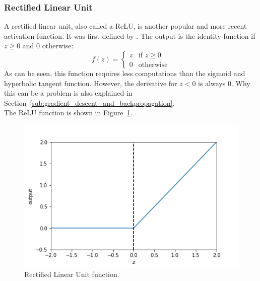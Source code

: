 \subsubsection{Rectified Linear Unit} %
\label{ssub:rectified_linear_unit}
A rectified linear unit, also called a ReLU, is another popular and more recent activation function. It was first defined by \cite{conf/icml/NairH10}. The output is the identity function if $z \ge 0$ and $0$ otherwise:
\begin{equation}
    f(z) = \begin{cases}
        z & \text{if $z \ge 0$}\\
        0 & \text{otherwise}
        \end{cases}
\end{equation}
As can be seen, this function requires less computations than the sigmoid and hyperbolic tangent function. However, the derivative for $z<0$ is always $0$. Why this can be a problem is also explained in Section~\ref{sub:gradient_descent_and_backpropagation}.\\
The ReLU function is shown in Figure~\ref{fig:relu}.
\begin{figure}[htb]
    \centering
    \includegraphics[width=.8\linewidth]{images/activation_functions/relu.png}
    \caption[Rectified Linear Unit function]{Rectified Linear Unit function.}
    \label{fig:relu}
\end{figure}

